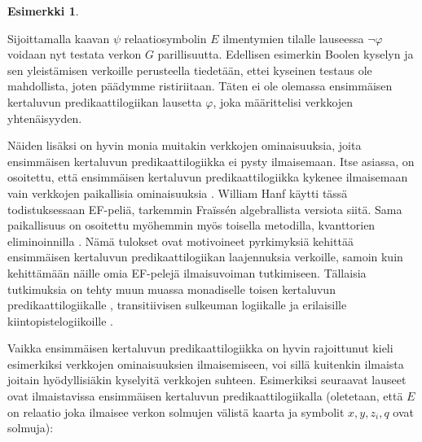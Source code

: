 \documentclass[finnish]{tktltiki2}
\theoremstyle{definition}
\newtheorem{esim}[lau]{Esimerkki}
\theoremstyle{remark}
\begin{document}
\begin{esim}
\begin{center}
\end{center}

Sijoittamalla kaavan $\psi$ relaatiosymbolin $E$ ilmentymien tilalle lauseessa $\neg \varphi$ voidaan nyt testata verkon $G$ parillisuutta. Edellisen esimerkin Boolen kyselyn ja sen yleistämisen verkoille perusteella tiedetään, ettei kyseinen testaus ole mahdollista, joten päädymme ristiriitaan. Täten ei ole olemassa ensimmäisen kertaluvun predikaattilogiikan lausetta $\varphi$, joka määrittelisi verkkojen yhtenäisyyden.
\end{esim}

Näiden lisäksi on hyvin monia muitakin verkkojen ominaisuuksia, joita ensimmäisen kertaluvun predikaattilogiikka ei pysty ilmaisemaan. Itse asiassa, on osoitettu, että ensimmäisen kertaluvun predikaattilogiikka kykenee ilmaisemaan vain verkkojen paikallisia ominaisuuksia \cite{Han65}. William Hanf käytti tässä todistuksessaan EF-peliä, tarkemmin Fraïssén algebrallista versiota siitä. Sama paikallisuus on osoitettu myöhemmin myös toisella metodilla, kvanttorien eliminoinnilla \cite{Gai82}. Nämä tulokset ovat motivoineet pyrkimyksiä kehittää ensimmäisen kertaluvun predikaattilogiikan laajennuksia verkoille, samoin kuin kehittämään näille omia EF-pelejä ilmaisuvoiman tutkimiseen. Tällaisia tutkimuksia on tehty muun muassa monadiselle toisen kertaluvun predikaattilogiikalle \cite{Fag75} \cite{Fag93}, transitiivisen sulkeuman logiikalle \cite{Gra92} ja erilaisille kiintopistelogiikoille \cite{Bos93}.

Vaikka ensimmäisen kertaluvun predikaattilogiikka on hyvin rajoittunut kieli esimerkiksi verkkojen ominaisuuksien ilmaisemiseen, voi sillä kuitenkin ilmaista joitain hyödyllisiäkin kyselyitä verkkojen suhteen. Esimerkiksi seuraavat lauseet ovat ilmaistavissa ensimmäisen kertaluvun predikaattilogiikalla (oletetaan, että $E$ on relaatio joka ilmaisee verkon solmujen välistä kaarta ja symbolit $x, y, z_i, q$ ovat solmuja):
\end{document}
